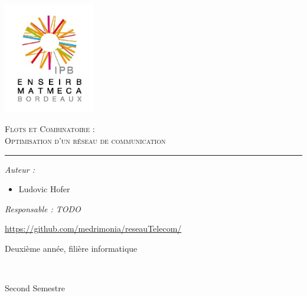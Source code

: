 \documentclass[a4paper,12pt]{article}
\begin{document}
\begin{center}
  \includegraphics [width=40mm]{ENSEIRB-MATMECA.jpg}


\textsc{\Huge Flots et Combinatoire :}\\
\vspace{0.5cm}
\textsc{\Huge Optimisation d'un réseau de communication}\\
\rule{0.4\textwidth}{1pt}


\begin{center}
  
  \begin{flushleft}
    \large
    \emph{Auteur :}\\
    \begin{itemize}
    \item Ludovic Hofer
    \end{itemize}
  \end{flushleft}
  
  
  \begin{flushright}
    \large
    \emph{Responsable : TODO}
  \end{flushright}
\end{center}


{\large \url{https://github.com/medrimonia/reseauTelecom/}}

                  
{\large Deuxième année, filière informatique}

~

{\large Second Semestre}\\
                  
\end{center}
\thispagestyle{empty}
\pagebreak
\end{document}
